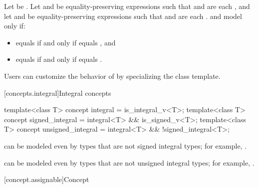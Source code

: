 \begin{itemdescr}
\pnum
Let  be .
Let  and  be
equality-preserving expressions such that
 and  are each , and
let  and  be equality-preserving expressions such that
 and  are each .
 and  model 
only if:
\begin{itemize}
\item {} equals  if and only if
   equals , and
\item {} equals  if and only if
   equals .
\end{itemize}

\pnum
\begin{note}
Users can customize the behavior of  by specializing the
 class template.
\end{note}

\end{itemdescr}

[concepts.integral]{Integral concepts}

%
%
%
\begin{itemdecl}
template<class T>
  concept integral = is_integral_v<T>;
template<class T>
  concept signed_integral = integral<T> && is_signed_v<T>;
template<class T>
  concept unsigned_integral = integral<T> && !signed_integral<T>;
\end{itemdecl}

\begin{itemdescr}
\pnum
\begin{note}
 can be modeled even by types that are
not signed integral types; for example, .
\end{note}

\pnum
\begin{note}
 can be modeled even by types that are
not unsigned integral types; for example, .
\end{note}
\end{itemdescr}

[concept.assignable]{Concept }

